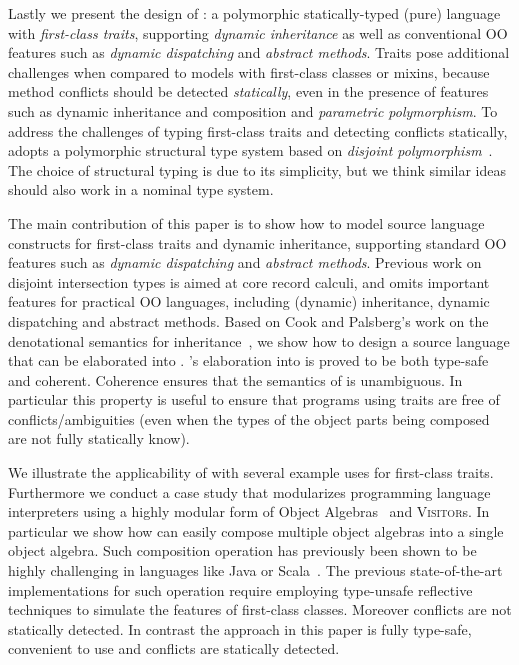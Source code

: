 Lastly we present the design of \sedel: a polymorphic statically-typed
(pure) language with \emph{first-class traits}, supporting \emph{dynamic
  inheritance} as well as conventional OO features such as
\emph{dynamic dispatching} and \emph{abstract methods}.
Traits pose additional challenges when compared to
models with first-class classes or mixins, because method conflicts
should be detected \emph{statically}, even in the presence of features
such as dynamic inheritance and composition and \emph{parametric polymorphism}.
To address the challenges of typing first-class traits and detecting conflicts statically,
\sedel adopts a polymorphic structural type system based on
\emph{disjoint polymorphism}~\citep{alpuimdisjoint}.
The choice of structural typing is due to its simplicity, but we think
similar ideas should also work in a nominal type system.

The main contribution of this paper is to show how to model source language
constructs for first-class traits and dynamic inheritance, supporting standard
OO features such as \emph{dynamic dispatching} and \emph{abstract methods}.
Previous work on disjoint intersection types is aimed at core record calculi,
and omits important features for practical OO languages, including (dynamic)
inheritance, dynamic dispatching and abstract methods. Based on Cook and
Palsberg's work on the denotational semantics for
inheritance~\citep{cook1989denotational}, we show how to design a source
language that can be elaborated into \fnamee. \sedel's elaboration into \fnamee
is proved to be both type-safe and coherent. Coherence ensures that the
semantics of \sedel is unambiguous. In particular this property is useful to
ensure that programs using traits are free of conflicts/ambiguities (even when
the types of the object parts being composed are not fully statically know).

We illustrate the applicability of \sedel with several example uses for
first-class traits. Furthermore we conduct a case study that modularizes
programming language interpreters using a highly modular form of Object
Algebras~\citep{oliveira2012extensibility} and \textsc{Visitor}s. In particular
we show how \sedel can easily compose multiple object algebras into a single
object algebra. Such composition operation has previously been shown to be
highly challenging in languages like Java or Scala~\citep{oliveira2013feature,
  rendel14attributes}. The previous state-of-the-art implementations for such
operation require employing type-unsafe reflective techniques
to simulate the features of first-class classes. Moreover conflicts are not
statically detected. In contrast the approach in this paper is fully
type-safe, convenient to use and conflicts are statically detected.

